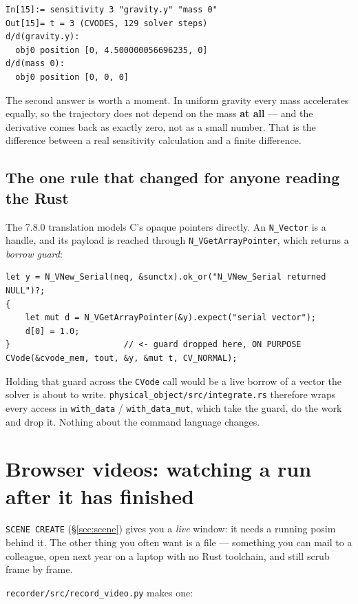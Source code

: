\documentclass[11pt]{article}
\newcommand{\kw}[1]{\texttt{\uppercase{#1}}}
\newcommand{\code}[1]{\texttt{#1}}
\begin{document}
\begin{lstlisting}
In[15]:= sensitivity 3 "gravity.y" "mass 0"
Out[15]= t = 3 (CVODES, 129 solver steps)
d/d(gravity.y):
  obj0 position [0, 4.500000056696235, 0]
d/d(mass 0):
  obj0 position [0, 0, 0]
\end{lstlisting}

The second answer is worth a moment. In uniform gravity every mass
accelerates equally, so the trajectory does not depend on the mass
\textbf{at all} --- and the derivative comes back as exactly zero, not as
a small number. That is the difference between a real sensitivity
calculation and a finite difference.

\subsection{The one rule that changed for anyone reading the Rust}

The 7.8.0 translation models C's opaque pointers directly. An
\code{N\_Vector} is a handle, and its payload is reached through
\code{N\_VGetArrayPointer}, which returns a \emph{borrow guard}:

\begin{lstlisting}
let y = N_VNew_Serial(neq, &sunctx).ok_or("N_VNew_Serial returned NULL")?;
{
    let mut d = N_VGetArrayPointer(&y).expect("serial vector");
    d[0] = 1.0;
}                       // <- guard dropped here, ON PURPOSE
CVode(&cvode_mem, tout, &y, &mut t, CV_NORMAL);
\end{lstlisting}

Holding that guard across the \code{CVode} call would be a live borrow
of a vector the solver is about to write.
\code{physical\_object/src/integrate.rs} therefore wraps every access in
\code{with\_data} / \code{with\_data\_mut}, which take the guard, do the
work and drop it. Nothing about the command language changes.

\section{Browser videos: watching a run after it has finished}

\kw{scene create} (\S\ref{sec:scene}) gives you a \emph{live} window: it
needs a running posim behind it. The other thing you often want is a
file --- something you can mail to a colleague, open next year on a
laptop with no Rust toolchain, and still scrub frame by frame.

\code{recorder/src/record\_video.py} makes one:
\end{document}
